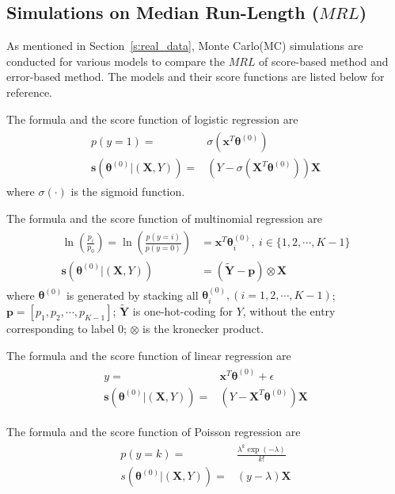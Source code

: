 \documentclass[twoside,11pt]{article}
\begin{document}
\begin{appendix}
\section{Simulations on Median Run-Length ($MRL$)}
\label{ss:simu_MRL}
As mentioned in Section~\ref{s:real_data}, Monte Carlo(MC) simulations are conducted for various models to compare the $MRL$ of score-based method and error-based method. The models and their score functions are listed below for reference.

\noindent
The formula and the score function of logistic regression are
\begin{align}
\begin{aligned}
p(y=1) =& \sigma ( \bm {x}^T\bm { \theta}^{ (0)} ) \\
\bm{s}(\bm { \theta} ^{(0)}|(\bm {X}, Y)) =&  (Y- \sigma (\bm {X}^T\bm { \theta} ^{ (0)})) \bm {X}
\end{aligned}
\label{eqn:logis_score}
\end{align}
where $ \sigma ( \cdot)$ is the sigmoid function.

\noindent
The formula and the score function of multinomial regression are
\begin{align}
\begin{aligned}
\ln (\frac{p_i}{p_0}) = \ln (\frac{p(y=i)}{p(y=0)})&=\bm {x}^{T} \bm { \theta}_i^{(0)}, ~ i \in \{1,2,\cdots,K-1\} \\
\bm {s}(\bm { \theta} ^{ (0)}| (\bm {X}, Y)) &= (\tilde{\bm{Y}}-\bm {p})\otimes \bm {X}
\end{aligned}
\label{eqn:multi_score}
\end{align}
where $\bm { \theta} ^{ (0)}$ is generated by stacking all $ \bm { \theta}_i ^{(0)}, (i=1,2,\cdots,K-1)$; $\bm {p}=[p_1, p_2, \cdots, p _{K-1}]$; $\tilde{\bm{Y}}$ is one-hot-coding for $Y$, without the entry corresponding to label $0$; $\otimes$ is the kronecker product. 

\noindent
The formula and the score function of linear regression are
\begin{align}
\begin{aligned}
y=& \bm {x}^T\bm { \theta}^{ (0)}  + \epsilon \\
\bm{s}(\bm { \theta} ^{(0)}|(\bm {X}, Y)) =& (Y - \bm {X}^T\bm { \theta}^{ (0)} ) \bm {X}
\end{aligned}
\label{eqn:lin_score}
\end{align}

\noindent
The formula and the score function of Poisson regression are
\begin{align}
\begin{aligned}
p(y=k)=&\frac{ \lambda ^{k} \exp(- \lambda)}{k!} \\
s(\bm { \theta} ^{(0)}|(\bm {X}, Y))=& (y- \lambda)\bm {X}
\end{aligned}
\label{eqn:pois_score}
\end{align}


\end{appendix}
\end{document}
